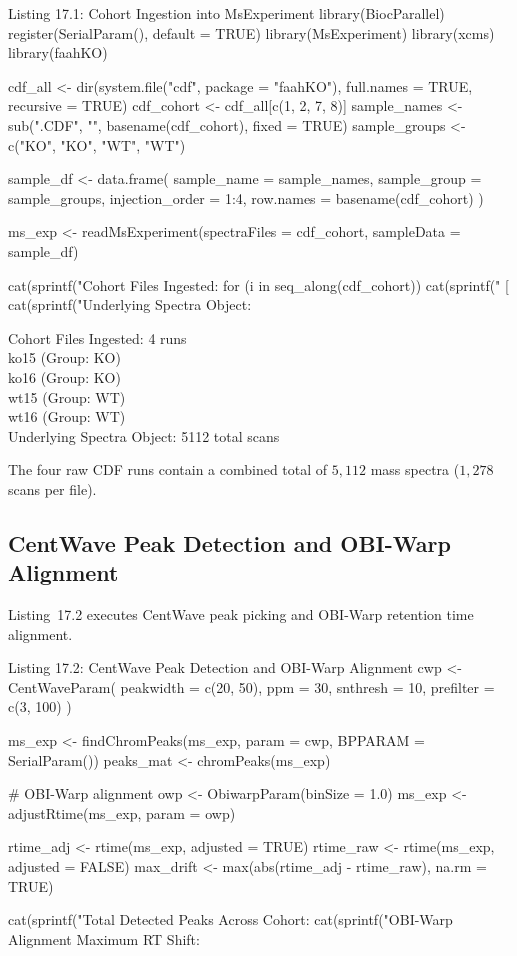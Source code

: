 \documentclass[11pt,twoside,openright]{book}
\begin{document}
\begin{rchunk}{Listing 17.1: Cohort Ingestion into MsExperiment}
library(BiocParallel)
register(SerialParam(), default = TRUE)
library(MsExperiment)
library(xcms)
library(faahKO)

cdf_all <- dir(system.file("cdf", package = "faahKO"), full.names = TRUE, recursive = TRUE)
cdf_cohort <- cdf_all[c(1, 2, 7, 8)]
sample_names <- sub(".CDF", "", basename(cdf_cohort), fixed = TRUE)
sample_groups <- c("KO", "KO", "WT", "WT")

sample_df <- data.frame(
  sample_name     = sample_names,
  sample_group    = sample_groups,
  injection_order = 1:4,
  row.names       = basename(cdf_cohort)
)

ms_exp <- readMsExperiment(spectraFiles = cdf_cohort, sampleData = sample_df)

cat(sprintf("Cohort Files Ingested: %
for (i in seq_along(cdf_cohort)) {
  cat(sprintf("  [%
}
cat(sprintf("Underlying Spectra Object: %
\end{rchunk}

\begin{routput}
Cohort Files Ingested: 4 runs\\
\enspace\enspace [1] ko15 (Group: KO)\\
\enspace\enspace [2] ko16 (Group: KO)\\
\enspace\enspace [3] wt15 (Group: WT)\\
\enspace\enspace [4] wt16 (Group: WT)\\
Underlying Spectra Object: 5112 total scans
\end{routput}

The four raw CDF runs contain a combined total of $5{,}112$ mass spectra ($1{,}278$ scans per file).

\subsection{CentWave Peak Detection and OBI-Warp Alignment}

Listing~17.2 executes CentWave peak picking and OBI-Warp retention time alignment.

\begin{rchunk}{Listing 17.2: CentWave Peak Detection and OBI-Warp Alignment}
cwp <- CentWaveParam(
  peakwidth = c(20, 50),
  ppm       = 30,
  snthresh  = 10,
  prefilter = c(3, 100)
)

ms_exp <- findChromPeaks(ms_exp, param = cwp, BPPARAM = SerialParam())
peaks_mat <- chromPeaks(ms_exp)

# OBI-Warp alignment
owp <- ObiwarpParam(binSize = 1.0)
ms_exp <- adjustRtime(ms_exp, param = owp)

rtime_adj <- rtime(ms_exp, adjusted = TRUE)
rtime_raw <- rtime(ms_exp, adjusted = FALSE)
max_drift <- max(abs(rtime_adj - rtime_raw), na.rm = TRUE)

cat(sprintf("Total Detected Peaks Across Cohort: %
cat(sprintf("OBI-Warp Alignment Maximum RT Shift: %
\end{rchunk}
\end{document}
